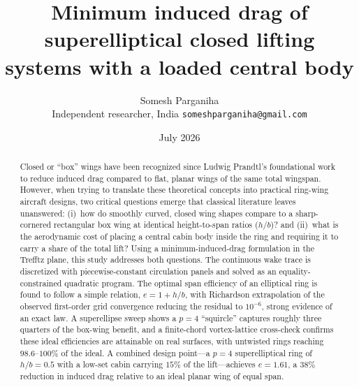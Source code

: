 \documentclass[11pt]{article}
\title{Minimum induced drag of superelliptical closed lifting systems
with a loaded central body}
\author{Somesh Parganiha\\
\small Independent researcher, India \quad
\texttt{someshparganiha@gmail.com}}
\date{July 2026}
\begin{document}
\maketitle

\begin{abstract}
Closed or ``box'' wings have been recognized since Ludwig Prandtl's
foundational work to reduce induced drag compared to flat, planar wings of
the same total wingspan. However, when trying to translate these
theoretical concepts into practical ring-wing aircraft designs, two
critical questions emerge that classical literature leaves unanswered:
(i)~how do smoothly curved, closed wing shapes compare to a sharp-cornered
rectangular box wing at identical height-to-span ratios ($h/b$)? and
(ii)~what is the aerodynamic cost of placing a central cabin body inside
the ring and requiring it to carry a share of the total lift? Using a
minimum-induced-drag formulation in the Trefftz plane, this study addresses
both questions. The continuous wake trace is discretized with
piecewise-constant circulation panels and solved as an equality-constrained
quadratic program. The optimal span efficiency of an elliptical ring is
found to follow a simple relation, $e = 1 + h/b$, with Richardson
extrapolation of the observed first-order grid convergence reducing the
residual to $10^{-6}$, strong evidence of an exact law. A superellipse
sweep shows a $p=4$ ``squircle'' captures roughly three quarters of the
box-wing benefit, and a finite-chord vortex-lattice cross-check confirms
these ideal efficiencies are attainable on real surfaces, with untwisted
rings reaching $98.6$--$100\%$ of the ideal. A combined design point---a
$p=4$ superelliptical ring of $h/b=0.5$ with a low-set cabin carrying
$15\%$ of the lift---achieves $e=1.61$, a $38\%$ reduction in induced drag
relative to an ideal planar wing of equal span.
\end{abstract}
\end{document}
